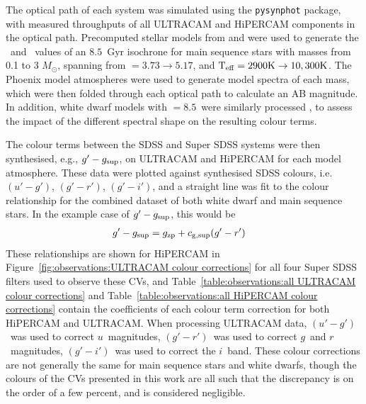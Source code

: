 The optical path of each system was simulated using the \texttt{pysynphot} package, with measured throughputs of all ULTRACAM and HiPERCAM components in the optical path. Precomputed stellar models from \citet{Dotter2016} and \citet{Choi2016} were used to generate the \teff\ and \logg\ values of an $8.5$\ Gyr isochrone for main sequence stars with masses from 0.1 to 3 $M_\odot$, spanning from \logg $= 3.73 \to 5.17$, and $\rm{T_{eff}} = 2900K \to 10,300K$. The Phoenix model atmospheres \citep{allard2012} were used to generate model spectra of each mass, which were then folded through each optical path to calculate an AB magnitude. In addition, white dwarf models with \logg$=8.5$\ were similarly processed \citep{koester2010, tremblay2009}, to assess the impact of the different spectral shape on the resulting colour terms.

The colour terms between the SDSS and Super SDSS systems were then synthesised, e.g., $g'-g_{\rm sup}$, on ULTRACAM and HiPERCAM for each model atmosphere. These data were plotted against synthesised SDSS colours, i.e. $(u'-g')$, $(g'-r')$, $(g'-i')$, and a straight line was fit to the colour relationship for the combined dataset of both white dwarf and main sequence stars. In the example case of $g'-g_{\rm sup}$, this would be
\begin{align*}
    g' - g_{\rm sup} &= g_{\rm zp} + c_{\rm g, sup}(g'-r')
\end{align*}
These relationships are shown for HiPERCAM in Figure~\ref{fig:observations:ULTRACAM colour corrections} for all four Super SDSS filters used to observe these CVs, and Table~\ref{table:observations:all ULTRACAM colour corrections} and Table~\ref{table:observations:all HiPERCAM colour corrections} contain the coefficients of each colour term correction for both HiPERCAM and ULTRACAM.
When processing ULTRACAM data, $(u'-g')$\ was used to correct $u$\ magnitudes, $(g'-r')$\ was used to correct $g$\ and $r$\ magnitudes, $(g'-i')$\ was used to correct the $i$\ band.
These colour corrections are not generally the same for main sequence stars and white dwarfs, though the colours of the CVs presented in this work are all such that the discrepancy is on the order of a few percent, and is considered negligible.

